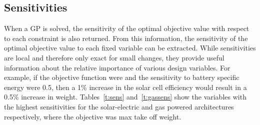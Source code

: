 {%
\textbf{}%
}

\DIFdelend \subsection{Sensitivities}

When a GP is solved, the sensitivity of the optimal objective value with respect to each constraint is also returned.  
From this information, the sensitivity of the optimal objective value to each fixed variable can be extracted.\cite{hoburgthesis} 
While sensitivities are local and therefore only exact for small changes, they provide useful information about the relative importance of various design variables. 
For example, if the objective function were \DIFdelbegin {}\DIFdelend \DIFaddbegin {}\DIFaddend and the sensitivity to battery specific energy were 0.5, then a 1\% increase in the solar cell efficiency would result in a 0.5\% increase in weight.  
Tables~\ref{t:sens} and~\ref{t:gassens} show the variables with the highest sensitivities for the solar-electric and gas powered architectures respectively, where the objective was max take off weight.

